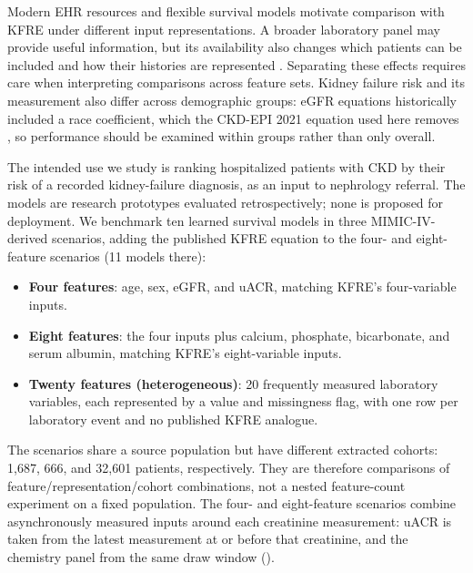 \documentclass[10pt,letterpaper]{article}
\begin{document}
Modern EHR resources and flexible survival models motivate comparison with KFRE under different input representations. A broader laboratory panel may provide useful information, but its availability also changes which patients can be included and how their histories are represented \cite{ghosh2023machine_nomogram,kdigo2024}. Separating these effects requires care when interpreting comparisons across feature sets. Kidney failure risk and its measurement also differ across demographic groups: eGFR equations historically included a race coefficient, which the CKD-EPI 2021 equation used here removes \cite{inker2021ckdepi}, so performance should be examined within groups rather than only overall.

The intended use we study is ranking hospitalized patients with CKD by their risk of a recorded kidney-failure diagnosis, as an input to nephrology referral. The models are research prototypes evaluated retrospectively; none is proposed for deployment. We benchmark ten learned survival models in three MIMIC-IV-derived \cite{johnson2023mimic_ehr} scenarios, adding the published KFRE equation to the four- and eight-feature scenarios (11 models there):

\begin{itemize}
    \item \textbf{Four features}: age, sex, eGFR, and uACR, matching KFRE's four-variable inputs.
    \item \textbf{Eight features}: the four inputs plus calcium, phosphate, bicarbonate, and serum albumin, matching KFRE's eight-variable inputs.
    \item \textbf{Twenty features (heterogeneous)}: 20 frequently measured laboratory variables, each represented by a value and missingness flag, with one row per laboratory event and no published KFRE analogue.
\end{itemize}

The scenarios share a source population but have different extracted cohorts: 1{,}687, 666, and 32{,}601 patients, respectively. They are therefore comparisons of feature/representation/cohort combinations, not a nested feature-count experiment on a fixed population. The four- and eight-feature scenarios combine asynchronously measured inputs around each creatinine measurement: uACR is taken from the latest measurement at or before that creatinine, and the chemistry panel from the same draw window ().
\end{document}
